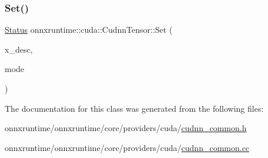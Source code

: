 \mbox{\label{classonnxruntime_1_1cuda_1_1CudnnTensor_ac362e34636ab4f8828e578e632b4fbe8}} 
\subsubsection{\texorpdfstring{Set()}{Set()}\hspace{0.1cm}{\footnotesize\ttfamily [2/2]}}
{\footnotesize\ttfamily \mbox{\hyperlink{classonnxruntime_1_1common_1_1Status}{Status}} onnxruntime\+::cuda\+::\+Cudnn\+Tensor\+::\+Set (\begin{DoxyParamCaption}\item[{const \mbox{\hyperlink{classonnxruntime_1_1cuda_1_1CudnnTensor}{Cudnn\+Tensor}} \&}]{x\+\_\+desc,  }\item[{cudnn\+Batch\+Norm\+Mode\+\_\+t}]{mode }\end{DoxyParamCaption})}



The documentation for this class was generated from the following files\+:\begin{DoxyCompactItemize}
\item 
onnxruntime/onnxruntime/core/providers/cuda/\mbox{\hyperlink{cudnn__common_8h}{cudnn\+\_\+common.\+h}}\item 
onnxruntime/onnxruntime/core/providers/cuda/\mbox{\hyperlink{cudnn__common_8cc}{cudnn\+\_\+common.\+cc}}\end{DoxyCompactItemize}
